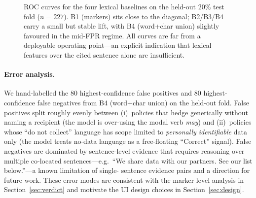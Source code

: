 \documentclass[11pt,a4paper]{article}
\begin{document}
\begin{figure}[t]
\centering
{}
\caption{ROC curves for the four lexical baselines on the held-out
$20\%$ test fold ($n=227$). B1 (markers) sits close to the diagonal;
B2/B3/B4 carry a small but stable lift, with B4 (word+char union)
slightly favoured in the mid-FPR regime. All curves are far from a
deployable operating point---an explicit indication that lexical
features over the cited sentence alone are insufficient.}
\label{fig:roc}
\end{figure}

\paragraph{Error analysis.}
We hand-labelled the $80$ highest-confidence false positives and
$80$ highest-confidence false negatives from B4 (word+char union) on
the held-out fold. False positives split roughly evenly between
(i)~policies that hedge generically without naming a recipient (the
model is over-using the modal verb \emph{may}) and (ii)~policies
whose ``do not collect'' language has scope limited to
\emph{personally identifiable} data only (the model treats no-data
language as a free-floating ``Correct'' signal). False negatives are
dominated by sentence-level evidence that requires reasoning over
multiple co-located sentences---e.g.\ ``We share data with our
partners. See our list below.''---a known limitation of single-
sentence evidence pairs and a direction for future work. These error
modes are consistent with the marker-level analysis in
Section~\ref{sec:verdict} and motivate the UI design choices in
Section~\ref{sec:design}.
\end{document}
